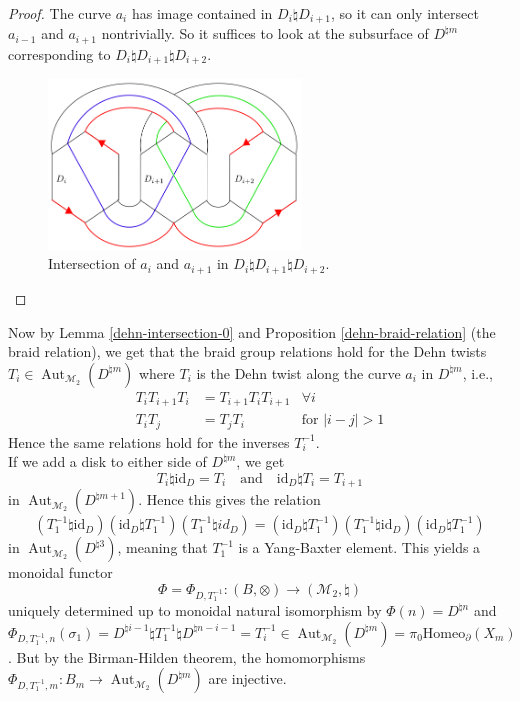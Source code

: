 \documentclass[reqno]{amsart}
\theoremstyle{definition}
\theoremstyle{remark}
\DeclareMathOperator{\Aut}{Aut}
\newcommand{\id}{{\mathrm{id}}}
\newcommand{\Homeo}{{\mathrm{Homeo}}}
\begin{document}
\begin{proof}
    The curve $a_i$ has image contained in $D_i \natural D_{i+1}$,
    so it can only intersect $a_{i-1}$ and $a_{i+1}$ nontrivially.
    So it suffices to look at the subsurface of
    $D^{\natural m}$ corresponding to
    $D_i \natural D_{i+1} \natural D_{i+2}$.

    \begin{figure}[H]
        \centering
        \includegraphics[width=0.6\textwidth]{intersection-a_is.png}
        \caption{Intersection of
        $a_i$ and $a_{i+1}$ in
    $D_i \natural D_{i+1} \natural D_{i+2}$.}
        \label{fig:intersection-a_is-png}
    \end{figure}
\end{proof}


Now by Lemma \ref{dehn-intersection-0} and Proposition \ref{dehn-braid-relation}
(the braid relation), we get that the
braid group relations hold for the Dehn twists
$T_i \in \Aut_{\mathcal{M}_2}\left( D^{\natural m} \right) $ 
where $T_i$ is the Dehn twist along the curve
$a_i$ in $D^{\natural m}$, i.e.,
\begin{align*}
    T_{i}T_{i+1}T_i 
    &= T_{i+1} T_i T_{i+1} &\forall i\\
    T_i T_j 
    &= T_j T_i &\text{for } \left| i-j \right| >1
\end{align*}
Hence the same relations hold for the
inverses $T_{i}^{-1}$.\\
\linebreak
If we add a disk to either side of $D^{\natural m}$, we get
\[
T_i \natural \id_{D} = T_i \quad \text{and} \quad
\id_{D}\natural T_i = T_{i+1}
\] 
in $\Aut_{\mathcal{M}_2}\left( D^{\natural m+1} \right) $.
Hence this gives the relation
\[
    \left( T_1^{-1} \natural \id_D \right) \left( \id_D \natural
    T_1^{-1} \right) \left( T_1^{-1} \natural id_D \right) 
    = 
    \left( \id_D \natural T_1^{-1} \right) 
    \left( T_1^{-1} \natural \id_D \right) 
    \left( \id_D \natural T_1^{-1} \right) 
\] 
in $\Aut_{\mathcal{M}_2} \left( D^{\natural 3} \right) $,
meaning that $T_1^{-1}$ is a Yang-Baxter element. This
yields a monoidal functor
\[
\Phi = \Phi_{D, T_1^{-1}} \colon
\left( B, \otimes \right) 
\to \left( \mathcal{M}_2, \natural \right) 
\] 
uniquely determined up to monoidal natural
isomorphism by
$\Phi (n) = D^{\natural n}$ and
$\Phi_{D, T_1^{-1}, n} \left( \sigma_1 \right) =
D^{\natural i-1} \natural  T_1^{-1} \natural D^{\natural n - i -1} =
T_i^{-1} \in 
\Aut_{\mathcal{M}_2}\left( D^{\natural m} \right) 
= \pi_0 \Homeo_{\partial} \left( X_m \right)$.
But by the Birman-Hilden theorem, the homomorphisms
$\Phi_{D, T_1^{-1}, m} \colon
B_m \to \Aut_{\mathcal{M}_2} 
\left( D^{\natural m} \right) $ are injective.
\end{document}
